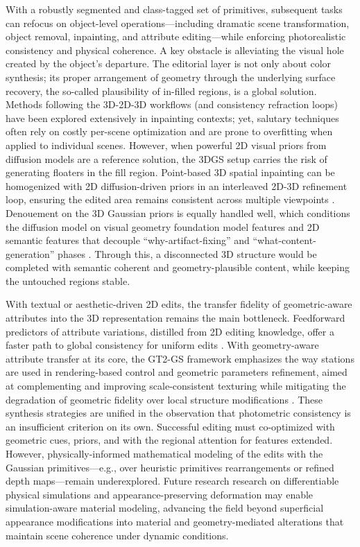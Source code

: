 \documentclass[11pt,a4paper]{article}
\begin{document}
With a robustly segmented and class-tagged set of primitives, subsequent tasks can refocus on object-level operations---including dramatic scene transformation, object removal, inpainting, and attribute editing---while enforcing photorealistic consistency and physical coherence. A key obstacle is alleviating the visual hole created by the object's departure. The editorial layer is not only about color synthesis; its proper arrangement of geometry through the underlying surface recovery, the so-called plausibility of in-filled regions, is a global solution. Methods following the 3D-2D-3D workflows (and consistency refraction loops) have been explored extensively in inpainting contexts; yet, salutary techniques often rely on costly per-scene optimization and are prone to overfitting when applied to individual scenes. However, when powerful 2D visual priors from diffusion models are a reference solution, the 3DGS setup carries the risk of generating floaters in the fill region. Point-based 3D spatial inpainting can be homogenized with 2D diffusion-driven priors in an interleaved 2D-3D refinement loop, ensuring the edited area remains consistent across multiple viewpoints \cite{arxiv:2601.20857v1}. Denouement on the 3D Gaussian priors is equally handled well, which conditions the diffusion model on visual geometry foundation model features and 2D semantic features that decouple ``why-artifact-fixing'' and ``what-content-generation'' phases \cite{arxiv:2508.09667v1}. Through this, a disconnected 3D structure would be completed with semantic coherent and geometry-plausible content, while keeping the untouched regions stable.

With textual or aesthetic-driven 2D edits, the transfer fidelity of geometric-aware attributes into the 3D representation remains the main bottleneck. Feedforward predictors of attribute variations, distilled from 2D editing knowledge, offer a faster path to global consistency for uniform edits \cite{arxiv:2602.11638v3}. With geometry-aware attribute transfer at its core, the GT2-GS framework emphasizes the way stations are used in rendering-based control and geometric parameters refinement, aimed at complementing and improving scale-consistent texturing while mitigating the degradation of geometric fidelity over local structure modifications \cite{arxiv:2505.15208v4}. These synthesis strategies are unified in the observation that photometric consistency is an insufficient criterion on its own. Successful editing must co-optimized with geometric cues, priors, and with the regional attention for features extended. However, physically-informed mathematical modeling of the edits with the Gaussian primitives---e.g., over heuristic primitives rearrangements or refined depth maps---remain underexplored. Future research research on differentiable physical simulations \cite{arxiv:2501.08174v2} and appearance-preserving deformation \cite{arxiv:2402.00525v1} may enable simulation-aware material modeling, advancing the field beyond superficial appearance modifications into material and geometry-mediated alterations that maintain scene coherence under dynamic conditions.
\end{document}
